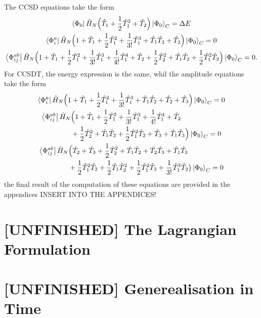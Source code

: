 The CCSD equations take the form 
\begin{gather}
    \bra{\Phi_0} \hat{H}_N
        \Big(\hat{T}_1 + \frac{1}{2}\hat{T}_1^2 + \hat{T}_2\Big)
    \ket{\Phi_0}_C = \Delta E \\
    \bra{\Phi^a_i} \hat{H}_N \Big(
        1 + \hat{T}_1 + \frac{1}{2}\hat{T}_1^2 + \frac{1}{3!}\hat{T}_1^3
        + \hat{T}_1\hat{T}_2 + \hat{T}_2
    \Big) \ket{\Phi_0}_C = 0 \\
    \bra{\Phi^{ab}_{ij}} \hat{H}_N \Big(
        1 + \hat{T}_1 + \frac{1}{2}\hat{T}_1^2 + \frac{1}{3!}\hat{T}_1^3
        + \frac{1}{4!}\hat{T}_1^4 + \hat{T}_2 + \frac{1}{2}\hat{T}_2^2
        + \hat{T}_1 \hat{T}_2 + \frac{1}{2}\hat{T}_1^2 \hat{T}_2
    \Big) \ket{\Phi_0}_C = 0.
\end{gather}
For CCSDT, the energy expression is the same, whil the amplitude equations take
the form 
\begin{gather}
    \bra{\Phi^a_i} \hat{H}_N \Big(
        1 + \hat{T}_1 + \frac{1}{2}\hat{T}_1^2 + \frac{1}{3!}\hat{T}_1^3
        + \hat{T}_1\hat{T}_2 + \hat{T}_2 + \hat{T}_3
    \Big) \ket{\Phi_0}_C = 0 \\
    \begin{aligned}
    \bra{\Phi^{ab}_{ij}} \hat{H}_N& \Big(
        1 + \hat{T}_1 + \frac{1}{2}\hat{T}_1^2 + \frac{1}{3!}\hat{T}_1^3
        + \frac{1}{4!}\hat{T}_1^4 + \hat{T}_2 \\ &+ \frac{1}{2}\hat{T}_2^2
        + \hat{T}_1 \hat{T}_2 + \frac{1}{2}\hat{T}_1^2 \hat{T}_2
        + \hat{T}_3 + \hat{T}_1\hat{T}_3
    \Big) \ket{\Phi_0}_C = 0  
    \end{aligned} \\
    \begin{aligned}
    \bra{\Phi^{ab}_{ij}} \hat{H}_N& \Big(
        \hat{T}_2 + \hat{T}_3 + \frac{1}{2}\hat{T}_2^2 + \hat{T}_1\hat{T}_2
        + \hat{T}_2\hat{T}_3 + \hat{T}_1\hat{T}_3 \\
        &+ \frac{1}{2}\hat{T}_1^2\hat{T}_2 + \frac{1}{2}\hat{T}_1\hat{T}_2^2
        + \frac{1}{2} \hat{T}_1^2\hat{T}_3 + \frac{1}{3!} \hat{T}_1^3 \hat{T}_2
    \big) \ket{\Phi_0}_C = 0  
    \end{aligned}
\end{gather}
the final result of the computation of these equations are provided in the 
appendices INSERT INTO THE APPENDICES!

\section{[UNFINISHED] The Lagrangian Formulation}

\section{[UNFINISHED] Generealisation in Time}